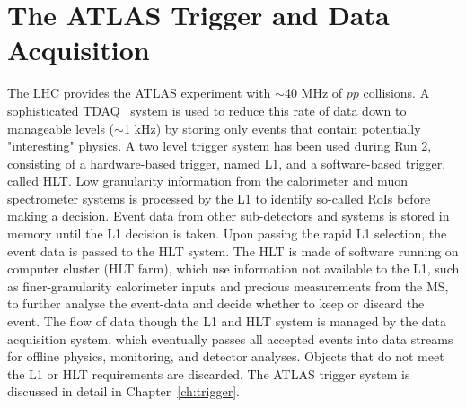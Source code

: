 	\section{The ATLAS Trigger and Data Acquisition}	
	\label{sec:ATLAStrig}
	The \ac{LHC} provides the \ac{ATLAS} experiment with $\sim$40 MHz of $pp$ collisions. 
	A sophisticated \ac{TDAQ}~\cite{TDAQRun1,TDAQRun2} system is used to reduce this rate of data down to manageable levels ($\sim$1 kHz) by storing only events that contain potentially "interesting" physics. 
	A two level trigger system has been used during Run 2, consisting of a hardware-based trigger, named \ac{L1}, and a software-based trigger, called \ac{HLT}. 
	Low granularity information from the calorimeter and muon spectrometer systems is processed by the \ac{L1} to identify so-called \acp{RoI} before making a decision. Event data from other sub-detectors and systems is stored in memory until the \ac{L1} decision is taken.
	Upon passing the rapid \ac{L1} selection, the event data is passed to the \ac{HLT} system.
	The \ac{HLT} is made of software running on computer cluster (\ac{HLT} farm), which use information not available to the \ac{L1}, such as finer-granularity calorimeter inputs and precious measurements from the \ac{MS}, to further analyse the event-data and decide whether to keep or discard the event. 
	The flow of data though the \ac{L1} and \ac{HLT} system is managed by the data acquisition system, which eventually passes all accepted events into data streams for offline physics, monitoring, and detector  analyses. 
	Objects that do not meet the \ac{L1} or \ac{HLT} requirements are discarded. 
	The \ac{ATLAS} trigger system is discussed in detail in Chapter~\ref{ch:trigger}.
	
	